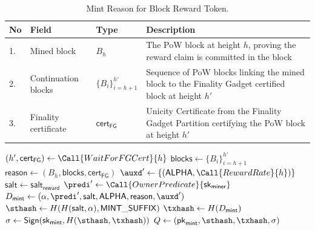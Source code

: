 \begin{table}[!htbp]
  \begin{center}
    \caption{Mint Reason for Block Reward Token.}\label{ta:pow-mint-reason}
    \begin{tabular}{|p{0.5cm}|p{3.2cm}|p{2.5cm}|p{7cm}|}\hline
      No & Field & Type & Description \\\hline\hline
      1. & Mined block & $B_h$ & The PoW block at height $h$, proving the reward claim is committed in the block \\\hline
      2. & Continuation blocks & $\{B_i\}_{i=h+1}^{h'}$ & Sequence of PoW blocks linking the mined block to the Finality Gadget certified block at height $h'$ \\\hline
      3. & Finality certificate & $\mathsf{cert}_\mathsf{FG}$ & Unicity Certificate from the Finality Gadget Partition certifying the PoW block at height $h'$ \\\hline
    \end{tabular}
  \end{center}
\end{table}


\begin{algorithm}[!htbp]
  \caption{Block Reward Token Minting Process}\label{alg:pow-reward}
  \begin{algorithmic}[0]
      \State {}
      \State
      \State {}
      \State $(h', \mathsf{cert}_\mathsf{FG}) \gets \Call{WaitForFGCert}{h}$
      \State
      \State {}
      \State $\mathsf{blocks} \gets \{B_i\}_{i=h+1}^{h'}$
      \State
      \State {}
      \State $\mathsf{reason} \gets (B_h, \mathsf{blocks}, \mathsf{cert}_\mathsf{FG})$
      \State $\auxd' \gets \{(\mathsf{ALPHA}, \Call{RewardRate}{h})\}$
      \State
      \State {}
      \State $\mathsf{salt} \gets \mathsf{salt}_\mathsf{reward}$  
      \State $\predi' \gets \Call{OwnerPredicate}{\mathsf{sk}_\mathsf{miner}}$
      \State $D_\mathsf{mint} \gets (\alpha, \predi', \mathsf{salt}, \mathsf{ALPHA}, \mathsf{reason}, \auxd')$
      \State
      \State {}
      \State $\sthash \gets H(H(\mathsf{salt}, \alpha), \mathsf{MINT\_SUFFIX})$ 
      \State $\txhash \gets H(D_\mathsf{mint})$
      \State $\sigma \gets \mathsf{Sign}(\mathsf{sk}_\mathsf{mint}, H(\sthash, \txhash))$  
      \State $Q \gets (\mathsf{pk}_\mathsf{mint}, \sthash, \txhash, \sigma)$
      \State {}
    \EndFunction
  \end{algorithmic}
\end{algorithm}

